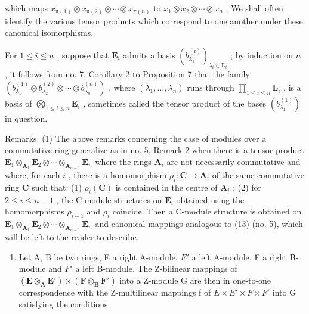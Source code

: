 which maps \(x_{\pi(1)} \otimes x_{\pi(2)} \otimes \cdots \otimes x_{\pi(n)}\) to \(x_{1} \otimes x_{2} \otimes \cdots \otimes x_{n}\) . We shall often identify the various tensor products which correspond to one another under these canonical isomorphisms.

For \(1 \leqslant i \leqslant n\) , suppose that \(\mathbf{E}_i\) admits a basis \((b_{\lambda_1}^{(i)})_{\lambda_i \in \mathbf{L}_i}\) ; by induction on \(n\) , it follows from no. 7, Corollary 2 to Proposition 7 that the family \((b_{\lambda_1}^{(1)} \otimes b_{\lambda_2}^{(2)} \otimes \cdots \otimes b_{\lambda_n}^{(n)})\) , where \((\lambda_1, \ldots, \lambda_n)\) runs through \(\prod_{1 \leqslant i \leqslant n} \mathbf{L}_i\) , is a basis of \(\bigotimes_{1 \leqslant i \leqslant n} \mathbf{E}_i\) , sometimes called the tensor product of the bases \((b_{\lambda_1}^{(1)})\) in question.

Remarks. (1) The above remarks concerning the case of modules over a commutative ring generalize as in no. 5, Remark 2 when there is a tensor product \(\mathbf{E}_1 \otimes_{\mathbf{A}_1} \mathbf{E}_2 \otimes \cdots \otimes_{\mathbf{A}_{n-1}} \mathbf{E}_n\) where the rings \(\mathbf{A}_i\) are not necessarily commutative and where, for each \(i\) , there is a homomorphism \(\rho_i: \mathbf{C} \to \mathbf{A}_i\) of the same commutative ring \(\mathbf{C}\) such that: (1) \(\rho_i(\mathbf{C})\) is contained in the centre of \(\mathbf{A}_i\) ; (2) for \(2 \leqslant i \leqslant n - 1\) , the C-module structures on \(\mathbf{E}_i\) obtained using the homomorphisms \(\rho_{i-1}\) and \(\rho_i\) coincide. Then a C-module structure is obtained on \(\mathbf{E}_1 \otimes_{\mathbf{A}_1} \mathbf{E}_2 \otimes \cdots \otimes_{\mathbf{A}_{n-1}} \mathbf{E}_n\) and canonical mappings analogous to (13) (no. 5), which will be left to the reader to describe.

\begin{enumerate}
\def\labelenumi{(\arabic{enumi})}
\setcounter{enumi}{1}
\tightlist
\item
  Let A, B be two rings, E a right A-module, \(E'\) a left A-module, F a right B-module and \(F'\) a left B-module. The Z-bilinear mappings of \((\mathbf{E} \otimes_{\mathbf{A}} \mathbf{E}') \times (\mathbf{F} \otimes_{\mathbf{B}} \mathbf{F}')\) into a Z-module G are then in one-to-one correspondence with the Z-multilinear mappings f of \(E \times E' \times F \times F'\) into G satisfying the conditions
\end{enumerate}

